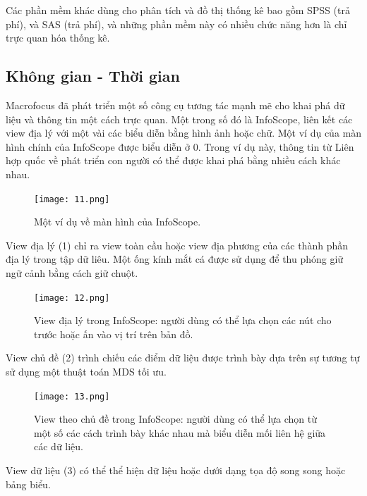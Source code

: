 \documentclass[13pt]{scrartcl} %
\begin{document}
Các phần mềm khác dùng cho phân tích và đồ thị thống kê bao gồm SPSS (trả phí), và SAS (trả phí), và những phần mềm này có nhiều chức năng hơn là chỉ trực quan hóa thống kê.



\subsection{Không gian - Thời gian}
Macrofocus đã phát triển một số công cụ tương tác mạnh mẽ cho khai phá dữ liệu và thông tin một cách trực quan. Một trong số đó là InfoScope, liên kết các view địa lý với một vài các biểu diễn bằng hình ảnh hoặc chữ. Một ví dụ của màn hình chính của InfoScope được biểu diễn ở 0. Trong ví dụ này, thông tin từ Liên hợp quốc về phát triển con người có thể được khai phá bằng nhiều cách khác nhau.

\begin{figure}[!ht] %
    \centering
    \texttt{[image: 11.png]}
    \caption{Một ví dụ về màn hình của InfoScope.}
\end{figure}

View địa lý (1) chỉ ra view toàn cầu hoặc view địa phương của các thành phần địa lý trong tập dữ liêu. Một ống kính mắt cá được sử dụng để thu phóng giữ ngữ cảnh bằng cách giữ chuột.

\begin{figure}[!ht] %
    \centering
    \texttt{[image: 12.png]}
    \caption{View địa lý trong InfoScope: người dùng có thể lựa chọn các nút cho trước hoặc ấn vào vị trí trên bản đồ.}
\end{figure}

View chủ đề (2) trình chiếu các điểm dữ liệu được trình bày dựa trên sự tương tự sử dụng một thuật toán MDS tối ưu.

\begin{figure}[!ht] %
    \centering
    \texttt{[image: 13.png]}
    \caption{View theo chủ đề trong InfoScope: người dùng có thể lựa chọn từ một số các cách trình bày khác nhau mà biểu diễn mối liên hệ giữa các dữ liệu.}
\end{figure}

View dữ liệu (3) có thể thể hiện dữ liệu hoặc dưới dạng tọa độ song song hoặc bảng biểu.
\end{document}
